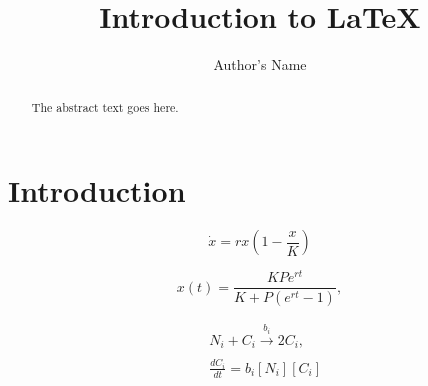 \documentclass{article}
\begin{document}
\title{Introduction to \LaTeX{}}
\author{Author's Name}

\maketitle

\begin{abstract}
The abstract text goes here.
\end{abstract}

\section{Introduction}


\begin{equation}
\label{eq:1}
\dot{x} = rx\left(1 - \frac{x}{K}\right)
\end{equation}

\begin{equation}
\label{eq:2}
x(t) = \frac{KPe^{rt}}{K + P(e^{rt}-1)},
\end{equation}

\begin{subequations}
	\label{eq:9}
	\begin{align}
		&N_{i} + C_{i} \xrightarrow[]{b_{i}} 2C_{i},\\
		&\frac{dC_{i}}{dt} = b_{i}[N_{i}][C_{i}]
	\end{align}
\end{subequations}
\end{document}
